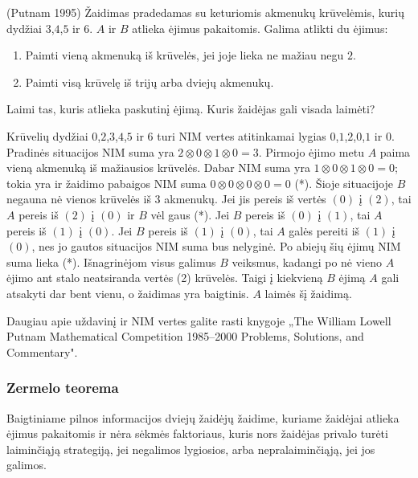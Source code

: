\begin{pavnr}(Putnam 1995)
  Žaidimas pradedamas su keturiomis akmenukų krūvelėmis, kurių dydžiai
  $3$,$4$,$5$ ir $6$. $A$ ir $B$ atlieka ėjimus pakaitomis. Galima atlikti
  du ėjimus:
  \begin{enumerate}
    \item Paimti vieną akmenuką iš krūvelės, jei joje lieka ne mažiau negu $2$.
    \item Paimti visą krūvelę iš trijų arba dviejų akmenukų.
  \end{enumerate}
  Laimi tas, kuris atlieka paskutinį ėjimą. Kuris žaidėjas gali visada laimėti?
\end{pavnr}

Krūvelių dydžiai $0$,$2$,$3$,$4$,$5$ ir $6$ turi NIM vertes atitinkamai
lygias $0$,$1$,$2$,$0$,$1$ ir $0$. Pradinės situacijos NIM suma yra
$2\otimes 0 \otimes 1 \otimes 0=3$. Pirmojo ėjimo metu $A$ paima vieną akmenuką iš mažiausios krūvelės. Dabar
NIM suma yra $1\otimes 0 \otimes 1 \otimes 0=0$; tokia yra ir žaidimo pabaigos NIM suma  $0\otimes 0 \otimes 0\otimes 0=0$ (*).  Šioje situacijoje $B$ negauna nė vienos krūvelės iš $3$ akmenukų. Jei jis pereis iš vertės $(0)$
į $(2)$, tai $A$ pereis iš $(2)$ į $(0)$ ir $B$ vėl gaus (*). Jei
$B$ pereis iš $(0)$ į $(1)$, tai $A$ pereis iš $(1)$ į $(0)$. Jei $B$
pereis iš $(1)$ į $(0)$, tai $A$ galės pereiti iš $(1)$ į $(0)$, nes jo
gautos situacijos NIM suma bus nelyginė. Po abiejų šių ėjimų NIM suma lieka (*). Išnagrinėjom visus galimus $B$
veiksmus, kadangi po nė vieno $A$ ėjimo ant stalo neatsiranda vertės (2)
krūvelės. Taigi į kiekvieną $B$ ėjimą $A$ gali atsakyti dar bent vienu, o
žaidimas yra baigtinis. $A$ laimės šį žaidimą. 

\begin{pastaba}Daugiau apie uždavinį ir NIM vertes galite rasti knygoje „The William Lowell Putnam Mathematical Competition 1985–2000 Problems, Solutions, and Commentary". 
\end{pastaba}

\subsubsection{Zermelo teorema}

\begin{thm}[Zermelo]
Baigtiniame pilnos informacijos dviejų žaidėjų žaidime, kuriame žaidėjai
atlieka ėjimus pakaitomis ir nėra sėkmės faktoriaus, kuris nors žaidėjas
privalo turėti laiminčiąją strategiją, jei negalimos lygiosios, arba
nepralaiminčiąją, jei jos galimos. 
\end{thm}

